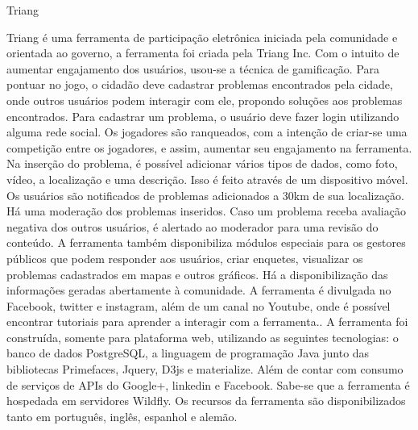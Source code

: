 Triang

Triang é uma ferramenta de participação eletrônica iniciada pela comunidade e orientada ao governo, a ferramenta foi criada pela Triang Inc. Com o intuito de aumentar engajamento dos
usuários, usou-se a técnica de gamificação. Para pontuar no jogo, o cidadão deve cadastrar problemas encontrados pela cidade, onde outros usuários podem interagir com ele, propondo
soluções aos problemas encontrados. Para cadastrar um problema, o usuário deve fazer login utilizando alguma rede social. Os jogadores são ranqueados, com a intenção de criar-se uma 
competição entre os jogadores, e assim, aumentar seu engajamento na ferramenta. Na inserção do problema, é possível adicionar vários tipos de dados, como foto, vídeo, a localização e 
uma descrição. Isso é feito através de um dispositivo móvel. Os usuários são notificados de problemas adicionados a 30km de sua localização. Há uma moderação dos problemas inseridos. 
Caso um problema receba avaliação negativa dos outros usuários, é alertado ao moderador para uma revisão do conteúdo. 
A ferramenta também disponibiliza módulos especiais para os gestores  públicos que podem responder aos usuários, criar enquetes, visualizar os problemas cadastrados em mapas e outros 
gráficos. Há a disponibilização das informações geradas abertamente à comunidade. 
A ferramenta é divulgada no Facebook, twitter e instagram, além de um canal no Youtube, onde é possível encontrar tutoriais para aprender a interagir com a ferramenta..
A ferramenta foi construída, somente para plataforma web, utilizando as seguintes tecnologias: o banco de dados PostgreSQL, a linguagem de programação Java junto das bibliotecas
Primefaces, Jquery, D3js e materialize. Além de contar com consumo de serviços de APIs do Google+, linkedin e Facebook. Sabe-se que a ferramenta é hospedada em servidores Wildfly. 
Os recursos da ferramenta são disponibilizados tanto em português, inglês, espanhol e alemão.
